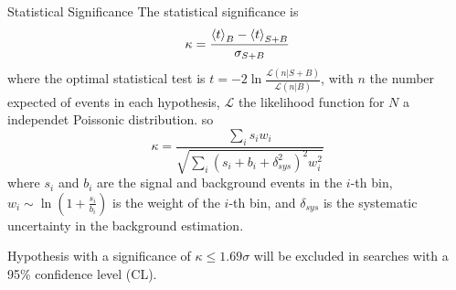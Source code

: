 \documentclass{../../bredelebeamer}
\begin{document}
\begin{frame}{Statistical Significance}
    The statistical significance is 
    \begin{equation}
        \kappa = \frac{\Braket{t}_{B} - \Braket{t}_{S+B}}{\sigma_{S+B}}
    \end{equation}
    where the optimal statistical test is $t=-2\ln \frac{\mathcal{L}(n|S+B)}{\mathcal{L}(n|B)}$, with $n$ the number expected of events in each hypothesis, $\mathcal{L}$ the likelihood function for $N$ a independet Poissonic distribution. so
    \begin{equation}
        \kappa = \frac{\sum_i s_i w_i}{\sqrt{\sum_i (s_i + b_i + \delta_{sys}^2)^2 w_i^2}}
    \end{equation}
    where $s_i$ and $b_i$ are the signal and background events in the $i$-th bin, $w_i\sim \ln (1+\frac{s_i}{b_i})$ is the weight of the $i$-th bin, and $\delta_{sys}$ is the systematic uncertainty in the background estimation.

    Hypothesis with a significance of $\kappa \leq 1.69\sigma$ will be excluded in searches with a 95\% confidence level (CL).
\end{frame}
\end{document}
